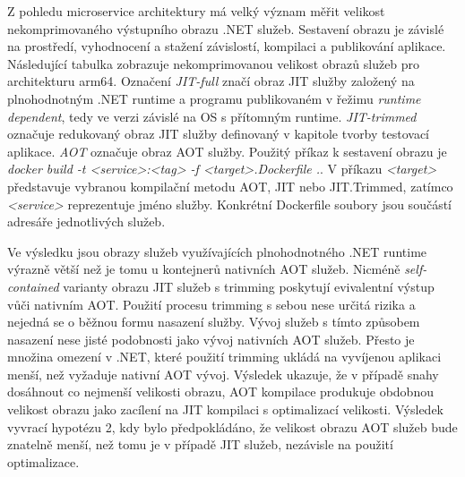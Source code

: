 Z pohledu microservice architektury má velký význam měřit velikost nekomprimovaného výstupního obrazu .NET služeb. Sestavení obrazu je závislé na prostředí, vyhodnocení a stažení závislostí, kompilaci a publikování aplikace. Následující tabulka zobrazuje nekomprimovanou velikost obrazů služeb pro architekturu arm64. Označení \emph{JIT-full} značí obraz JIT služby založený na plnohodnotným .NET runtime a programu publikovaném v řežimu \emph{runtime dependent}, tedy ve verzi závislé na OS s přítomným runtime. \emph{JIT-trimmed} označuje redukovaný obraz JIT služby definovaný v kapitole tvorby testovací aplikace. \emph{AOT} označuje obraz AOT služby. Použitý příkaz k sestavení obrazu je \emph{docker build -t <service>:<tag> -f <target>.Dockerfile .}. V příkazu \emph{<target>} představuje vybranou kompilační metodu AOT, JIT nebo JIT.Trimmed, zatímco \emph{<service>} reprezentuje jméno služby. Konkrétní Dockerfile soubory jsou součástí adresáře jednotlivých služeb.


Ve výsledku jsou obrazy služeb využívajících plnohodnotného .NET runtime výrazně větší než je tomu u kontejnerů nativních AOT služeb. Nicméně \emph{self-contained} varianty obrazu JIT služeb s trimming poskytují evivalentní výstup vůči nativním AOT. Použití procesu trimming s sebou nese určitá rizika a nejedná se o běžnou formu nasazení služby. Vývoj služeb s tímto způsobem nasazení nese jisté podobnosti jako vývoj nativních AOT služeb. Přesto je množina omezení v .NET, které použití trimming ukládá na vyvíjenou aplikaci menší, než vyžaduje nativní AOT vývoj. Výsledek ukazuje, že v případě snahy dosáhnout co nejmenší velikosti obrazu, AOT kompilace produkuje obdobnou velikost obrazu jako zacílení na JIT kompilaci s optimalizací velikosti. Výsledek vyvrací hypotézu 2, kdy bylo předpokládáno, že velikost obrazu AOT služeb bude znatelně menší, než tomu je v případě JIT služeb, nezávisle na použití optimalizace.

